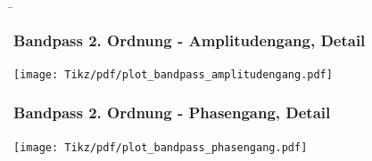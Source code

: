 
\b{%
\subsubsection{Bandpass 2. Ordnung - Amplitudengang, Detail}
\begin{frame}\ftx{\subsubsecname}\centering
    \texttt{[image: Tikz/pdf/plot\_bandpass\_amplitudengang.pdf]}
\end{frame}

\subsubsection{Bandpass 2. Ordnung - Phasengang, Detail}
\begin{frame}\ftx{\subsubsecname}\centering
    \texttt{[image: Tikz/pdf/plot\_bandpass\_phasengang.pdf]}
\end{frame}
}%

